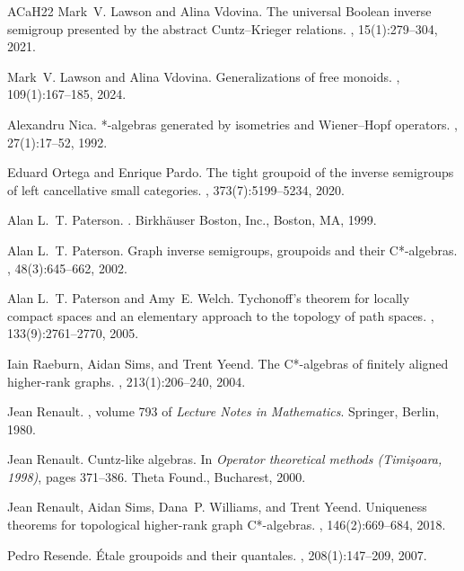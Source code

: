 \documentclass[11pt]{amsart}
\theoremstyle{definition}
\numberwithin{thm}{section}
\numberwithin{equation}{section}
\begin{document}
\begin{thebibliography}{ACaH{\etalchar{+}}22}
Mark~V. Lawson and Alina Vdovina.
\newblock The universal {B}oolean inverse semigroup presented by the abstract {C}untz--{K}rieger relations.
, 15(1):279--304, 2021.

Mark~V. Lawson and Alina Vdovina.
\newblock Generalizations of free monoids.
, 109(1):167--185, 2024.

Alexandru Nica.
*-algebras generated by isometries and {W}iener--{H}opf operators.
, 27(1):17--52, 1992.

Eduard Ortega and Enrique Pardo.
\newblock The tight groupoid of the inverse semigroups of left cancellative small categories.
, 373(7):5199--5234, 2020.

Alan L.~T. Paterson.
.
\newblock Birkh\"{a}user Boston, Inc., Boston, MA, 1999.

Alan L.~T. Paterson.
\newblock Graph inverse semigroups, groupoids and their {C}*-algebras.
, 48(3):645--662, 2002.

Alan L.~T. Paterson and Amy~E. Welch.
\newblock Tychonoff's theorem for locally compact spaces and an elementary approach to the topology of path spaces.
, 133(9):2761--2770, 2005.

Iain Raeburn, Aidan Sims, and Trent Yeend.
\newblock The {C}*-algebras of finitely aligned higher-rank graphs.
, 213(1):206--240, 2004.

Jean Renault.
, volume 793 of {\em Lecture Notes in Mathematics}.
\newblock Springer, Berlin, 1980.

Jean Renault.
\newblock Cuntz-like algebras.
\newblock In {\em Operator theoretical methods ({T}imi\c{s}oara, 1998)}, pages 371--386. Theta Found., Bucharest, 2000.

Jean Renault, Aidan Sims, Dana~P. Williams, and Trent Yeend.
\newblock Uniqueness theorems for topological higher-rank graph {C}*-algebras.
, 146(2):669--684, 2018.

Pedro Resende.
\newblock \'{E}tale groupoids and their quantales.
, 208(1):147--209, 2007.


\end{thebibliography}
\end{document}
